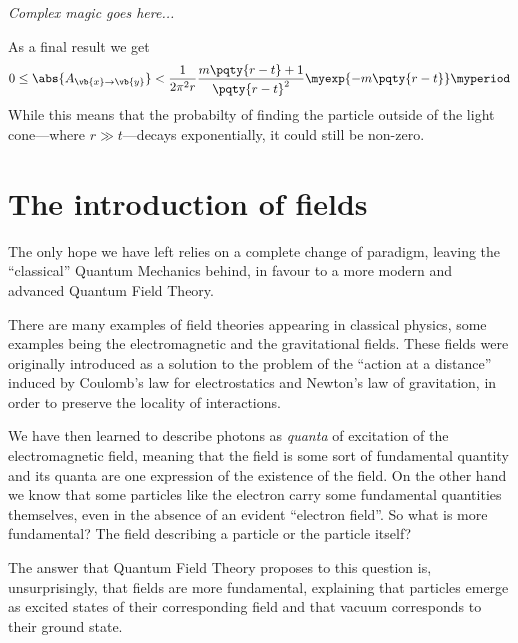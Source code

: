             \begin{center}
                \emph{Complex magic goes here...}
            \end{center}
            As a final result we get
            \begin{equation}
                \label{eq:exponential-estimate}
                0 \leq \abs{A_{\vb{x} \to \vb{y}}} < \frac{1}{2 \pi^2 r} \frac{m \pqty{r - t} + 1}{\pqty{r - t}^2} \myexp{-m\pqty{r - t}}
                \myperiod
            \end{equation}
            While this means that the probabilty of finding the particle outside of the light cone---where $r \gg t$---decays exponentially, it could still be non-zero.

    \section{The introduction of fields}
        The only hope we have left relies on a complete change of paradigm, leaving the ``classical'' Quantum Mechanics behind, in favour to a more modern and advanced Quantum Field Theory.

        There are many examples of field theories appearing in classical physics, some examples being the electromagnetic and the gravitational fields. These fields were originally introduced as a solution to the problem of the ``action at a distance'' induced by Coulomb's law for electrostatics and Newton's law of gravitation, in order to preserve the locality of interactions.

        We have then learned to describe photons as \emph{quanta} of excitation of the electromagnetic field, meaning that the field is some sort of fundamental quantity and its quanta are one expression of the existence of the field. On the other hand we know that some particles like the electron carry some fundamental quantities themselves, even in the absence of an evident ``electron field''. So what is more fundamental? The field describing a particle or the particle itself?

        The answer that Quantum Field Theory proposes to this question is, unsurprisingly, that fields are more fundamental, explaining that particles emerge as excited states of their corresponding field and that vacuum corresponds to their ground state.

